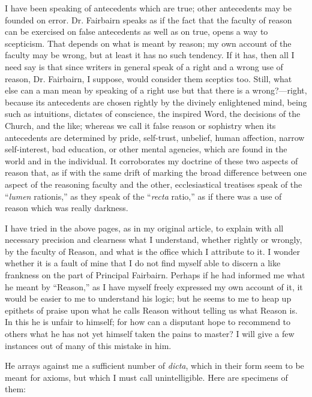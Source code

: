 I have been speaking of antecedents which are
true; other antecedents may be founded on error. Dr. Fairbairn speaks
as if the fact that the faculty of reason can be exercised on false
antecedents as well as on true, opens a way to scepticism. That
depends on what is meant by reason; my own account of the faculty may
be wrong, but at least it has no such tendency. If it has, then all I
need say is that since writers in general speak of a right and a wrong
use of reason, Dr. Fairbairn, I suppose, would consider them sceptics
too. Still, what else can a man mean by speaking of a right use but
that there is a wrong?—right, because its antecedents are chosen
rightly by the divinely enlightened mind, being such as intuitions,
dictates of conscience, the inspired Word, the decisions of the
Church, and the like; whereas we call it false reason or sophistry
when its antecedents are determined by pride, self-trust,
unbelief, human affection, narrow self-interest, bad education, or
other mental agencies, which are found in the world and in the
individual. It corroborates my doctrine of these two aspects of reason
that, as if with the same drift of marking the broad difference
between one aspect of the reasoning faculty and the other,
ecclesiastical treatises speak of the ``\emph{lumen} rationis,'' as they
speak of the ``\emph{recta} ratio,'' as if there was a use of reason
which was really darkness.


I have tried in the above pages, as in my
original article, to explain with all necessary precision and
clearness what I understand, whether rightly or wrongly, by the
faculty of Reason, and what is the office which I attribute to it. I
wonder whether it is a fault of mine that I do not find myself able to
discern a like frankness on the part of Principal Fairbairn. Perhaps
if he had informed me what he meant by ``Reason,'' as I have myself
freely expressed my own account of it, it would be easier to me to
understand his logic; but he seems to me to heap up epithets of praise
upon what he calls Reason without telling us what Reason is. In this
he is unfair to himself; for how can a disputant hope to
recommend to others what he has not yet himself taken the pains to
master? I will give a few instances out of many of this mistake in
him.

He arrays against me a sufficient number of \emph{dicta},
which in their form seem to be meant for axioms, but which I must call
unintelligible. Here are specimens of them:


